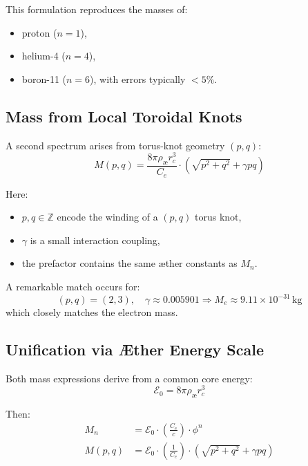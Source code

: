         This formulation reproduces the masses of:
        \begin{itemize}
          \item proton ($n=1$),
          \item helium-4 ($n=4$),
          \item boron-11 ($n=6$),
          with errors typically $< 5\%$.
        \end{itemize}

        \subsection{Mass from Local Toroidal Knots}

        A second spectrum arises from torus-knot geometry $(p,q)$:
        \begin{equation}
        M(p,q) = \frac{8\pi \rho_{\text{æ}} r_c^3}{C_e} \cdot \left( \sqrt{p^2 + q^2} + \gamma pq \right)
        \end{equation}

        Here:
        \begin{itemize}
          \item $p, q \in \mathbb{Z}$ encode the winding of a $(p,q)$ torus knot,
          \item $\gamma$ is a small interaction coupling,
          \item the prefactor contains the same æther constants as $M_n$.
        \end{itemize}

        A remarkable match occurs for:
        \[
        (p,q) = (2,3), \quad \gamma \approx 0.005901
        \Rightarrow M_e \approx 9.11 \times 10^{-31} \, \text{kg}
        \]
        which closely matches the electron mass.

        \subsection{Unification via Æther Energy Scale}

        Both mass expressions derive from a common core energy:
        \[
        \mathcal{E}_0 = 8\pi \rho_{\text{æ}} r_c^3
        \]

        Then:
        \begin{align}
        M_n &= \mathcal{E}_0 \cdot \left( \frac{C_e}{c} \right) \cdot \phi^n \\
        M(p,q) &= \mathcal{E}_0 \cdot \left( \frac{1}{C_e} \right) \cdot \left( \sqrt{p^2 + q^2} + \gamma pq \right)
        \end{align}

